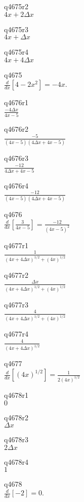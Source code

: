q4675r2\\
\(\displaystyle 4x + 2\Delta x \)

q4675r3\\
\(\displaystyle 4x + \Delta x \)

q4675r4\\
\(\displaystyle 4x + 4\Delta x \)

q4675\\
\(\displaystyle \frac{d}{dx} [4-2x^2] = -4x. \)

q4676r1\\
\(\displaystyle \frac{-4\Delta x}{4x - 5} \)

q4676r2\\
\(\displaystyle \frac{-5}{(4x-5)(4\Delta x + 4x - 5)} \)

q4676r3\\
\(\displaystyle \frac{-12}{4\Delta x + 4x - 5} \)

q4676r4\\
\(\displaystyle \frac{-12}{(4x-5)(4\Delta x + 4x - 5)} \)

q4676\\
\(\displaystyle \frac{d}{dx} \left [ \frac{3}{4x-5} \right ] = \frac{-12}{(4x-5)^2} \)

q4677r1\\
\(\displaystyle \frac{1}{(4x+4\Delta x)^{1/2} + (4x)^{1/2}} \)

q4677r2\\
\(\displaystyle \frac{\Delta x}{(4x + 4 \Delta x)^{1/2} + (4x)^{1/2}} \)

q4677r3\\
\(\displaystyle \frac{4}{(4x+4\Delta x)^{1/2} + (4x)^{1/2}} \)

q4677r4\\
\(\displaystyle \frac{4}{(4x + 4\Delta x)^{1/2}} \)

q4677\\
\(\displaystyle \frac{d}{dx} [(4x)^{1/2}] = \frac{1}{2(4x)^{1/2}} \)

q4678r1\\
\(\displaystyle 0 \)

q4678r2\\
\(\displaystyle \Delta x \)

q4678r3\\
\(\displaystyle 2\Delta x \)

q4678r4\\
\(\displaystyle 1 \)

q4678\\
\(\displaystyle \frac{d}{dx}[-2] = 0. \)

